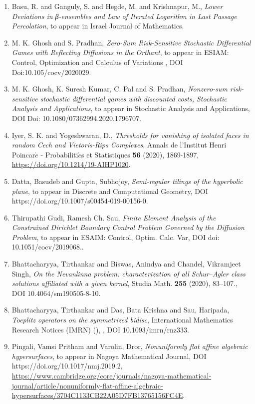 \begin{enumerate}
\item Basu, R. and Ganguly, S. and Hegde, M. and Krishnapur, M., \emph{Lower Deviations in β-ensembles and Law of Iterated Logarithm in Last Passage Percolation}, to appear in Israel Journal of Mathematics.
\item M. K. Ghosh and S. Pradhan, \emph{Zero-Sum Risk-Sensitive Stochastic Differential Games with Reflecting Diffusions in the Orthant}, to appear in ESIAM: Control, Optimization and Calculus of Variations , DOI Doi:10.105/cocv/2020029.
\item M. K. Ghosh, K. Suresh Kumar, C. Pal and S. Pradhan, \emph{Nonzero-sum risk-sensitive stochastic differential games with discounted costs, Stochastic Analysis and Applications}, to appear in Stochastic Analysis and Applications, DOI Doi: 10.1080/07362994.2020.1796707.
\item Iyer, S. K. and Yogeshwaran, D., \emph{Thresholds for vanishing of isolated faces in random Cech and Vietoris-Rips Complexes}, Annals de l'Institut Henri Poincar$\acute{e}$ - Probabiliti$\acute{e}$s et Statistiques {\bf 56} (2020), 1869-1897, \url{https://doi.org/10.1214/19-AIHP1020}.
\item Datta, Basudeb and Gupta, Subhojoy, \emph{Semi-regular tilings of the hyperbolic plane}, to appear in Discrete and Computational Geometry, DOI https://doi.org/10.1007/s00454-019-00156-0.
\item Thirupathi Gudi, Ramesh Ch. Sau, \emph{Finite Element Analysis of the Constrained Dirichlet Boundary Control Problem Governed by the Diffusion Problem}, to appear in ESAIM: Control, Optim. Calc. Var, DOI doi: 10.1051/cocv/2019068..
\item Bhattacharyya, Tirthankar and Biswas, Anindya and Chandel, Vikramjeet Singh, \emph{On the Nevanlinna problem: characterization of all Schur–Agler class solutions affiliated with a given kernel},  Studia Math. {\bf 255} (2020), 83–107., DOI 10.4064/sm190505-8-10.
\item Bhattacharyya, Tirthankar and Das, Bata Krishna and Sau, Haripada, \emph{Toeplitz operators on the symmetrized bidisc}, International Mathematics Research Notices (IMRN) {\bf } (), , DOI 10.1093/imrn/rnz333.
\item Pingali, Vamsi Pritham and Varolin, Dror, \emph{Nonuniformly flat affine algebraic hypersurfaces}, to appear in Nagoya Mathematical Journal, DOI https://doi.org/10.1017/nmj.2019.2, \url{https://www.cambridge.org/core/journals/nagoya-mathematical-journal/article/nonuniformly-flat-affine-algebraic-hypersurfaces/3704C1133CB22A05D7FB13765156FC4E}.

\end{enumerate}
